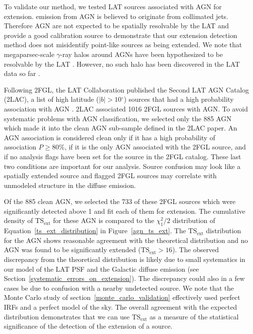 \documentclass[12pt,preprint]{aastex}
\newcommand{\gev}{\text{GeV}\xspace}
\newcommand{\tsext}{{\ensuremath{\text{TS}_{\text{ext}}}}\xspace}
\newcommand{\degree}{\ensuremath{^\circ}\xspace}
\begin{document}
To validate our method, we tested LAT sources associated with AGN for
extension.  \gev emission from AGN is believed to originate from collimated jets.  Therefore AGN are
not expected to be spatially resolvable by the LAT and provide a good
calibration source to demonstrate that our extension detection method
does not misidentify point-like sources as being extended.  We note that
megaparsec-scale $\gamma$-ray halos around AGNs have been hypothesized
to be resolvable by the LAT \citep{pair_halo_paper}. However, no such
halo has been discovered in the LAT data so far \citep{neronov_agn_halo}.

Following 2FGL, the LAT Collaboration published the Second LAT AGN
Catalog (2LAC), a list of high latitude ($|b|>10\degree$) sources
that had a high probability association with AGN \citep{second_agn_cat}.
2LAC associated 1016 2FGL sources with AGN.  To avoid systematic problems
with AGN classification, we selected only the 885 AGN which made it into
the clean AGN sub-sample defined in the 2LAC paper.  An AGN association is considered clean only
if it has a high probability of association $P\ge 80\%$, if it is the
only AGN associated with the 2FGL source, and if 
no analysis flags have been set for the source
in the 2FGL catalog. These last two conditions are important for our
analysis. Source confusion may look like a spatially extended source
and flagged 2FGL sources may correlate with unmodeled structure in
the diffuse emission.

Of the 885 clean AGN, we selected the 733 of these 2FGL sources which
were significantly detected above 1 \gev and fit each of them for
extension.  The cumulative density of \tsext for these AGN is compared
to the $\chi^2_1/2$ distribution of Equation~\ref{ts_ext_distribution}
in Figure~\ref{agn_ts_ext}.  The \tsext distribution
for the AGN shows reasonable agreement with the theoretical
distribution and no AGN was found to be significantly extended
($\tsext>16$).  The observed discrepancy from the theoretical
distribution is likely due to small systematics
in our model of the LAT PSF and the Galactic diffuse emission (see
Section~\ref{systematic_errors_on_extension}).  
The discrepancy could
also in a few cases be due to confusion with a nearby undetected source.
We note that the Monte Carlo study
of section~\ref{monte_carlo_validation} effectively used perfect
IRFs and a perfect model of the sky.
The overall agreement with the expected distribution demonstrates that
we can use \tsext as a measure of the statistical significance of the
detection of the extension of a source.
\end{document}
